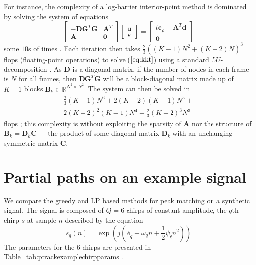 \documentclass{article}
\newcommand{\cLP}{\boldsymbol{c}_{\rho}}
\newcommand{\BS}[1]{\boldsymbol{#1}}
\begin{document}
\begin{sloppy}
For instance, the complexity of a log-barrier interior-point method is dominated
by solving the system of equations
\begin{equation}
    \label{eq:kkt}
    \begin{bmatrix}
        -\BS{D}\BS{G}^{T}\BS{G} & \BS{A}^{T} \\
        \BS{A} & \BS{0}
    \end{bmatrix}
    \begin{bmatrix}
        \BS{u} \\
        \BS{v}
    \end{bmatrix}
    =
    \begin{bmatrix}
        t\cLP + \BS{A}^{T}\BS{d} \\
        \BS{0}
    \end{bmatrix}
\end{equation}
some $10$s of times \cite[p.~590]{boyd2004convex}. 
Each iteration then takes ${\frac{2}{3}((K-1)N^{2} + (K-2)N)^{3}}$ flops (floating-point
operations) to solve ($\ref{eq:kkt}$) using a standard $LU$-decomposition
\cite[p.~98]{golub1996matrix}. As
$\BS{D}$ is a diagonal matrix, if
the number of nodes in each frame is $N$ for all frames, then
$\BS{D}\BS{G}^{T}\BS{G}$ will be a block-diagonal matrix made up of $K-1$ blocks
$\BS{B}_k \in \mathbb{R}^{N^{2}\times N^{2}}$. The system can then be solved in
\begin{multline*}
    \frac{2}{3}(K-1)N^{6} + 2(K-2)(K-1)N^{5} + \\
    2(K-2)^{2}(K-1)N^{4} + \frac{2}{3}(K-2)^{3}N^{3}
\end{multline*}
flops \cite[p.~675]{boyd2004convex}; this complexity is without exploiting the
sparsity of $\BS{A}$ nor the structure of $\BS{B}_k = \BS{D}_{k}\BS{C}$ --- the product
of some diagonal matrix $\BS{D}_{k}$ with an unchanging symmetric matrix
$\BS{C}$.

\section{Partial paths on an example signal\label{sec:mq_lp_compare_chirp}}

We compare the greedy and LP based methods for peak matching on a synthetic
signal. The signal is composed of $Q=6$ chirps of constant amplitude, the $q$th
chirp $s$ at sample $n$ described by the equation
\[
    s_{q}(n) = \exp(j(\phi_{q} + \omega_{q}n +
    \frac{1}{2} \psi_{q} n^{2}))
\]
The parameters for the 6 chirps are presented in
Table~\ref{tab:ptrackexamplechirpparams}.


\end{sloppy}
\end{document}
